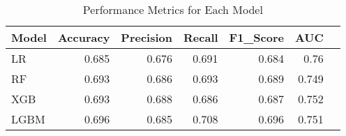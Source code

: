 \begin{table}[H]\centering
\caption{Performance Metrics for Each Model}
\label{Table 3 :performance_metrics}
\begin{tabular}{lrrrrrr}
\toprule
Model & Accuracy & Precision & Recall & F1\_Score & AUC \\
\midrule
LR & 0.685 & 0.676 & 0.691 & 0.684 & 0.76 \\
RF & 0.693 & 0.686 & 0.693 & 0.689 & 0.749 \\
XGB & 0.693 & 0.688 & 0.686 & 0.687 & 0.752 \\
LGBM & 0.696 & 0.685 & 0.708 & 0.696 & 0.751 \\
\bottomrule
\end{tabular}
\end{table}
